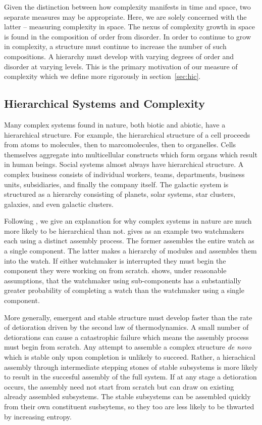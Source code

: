 Given the distinction between how complexity manifests in time and space, two
separate measures may be appropriate. Here, we are solely concerned with the
latter -- measuring complexity in space. The nexus of complexity growth in space
is found in the composition of order from disorder. In order to continue to
grow in complexity, a structure must continue to increase the number of such
compositions. A hierarchy must develop with varying degrees of order and
disorder at varying levels. This is the primary motivation of our measure of
complexity which we define more rigorously in section~\ref{sec:hic}.

\subsection{Hierarchical Systems and Complexity}

Many complex systems found in nature, both biotic and abiotic, have a
hierarchical structure. For example, the hierarchical structure of a cell
proceeds from atoms to molecules, then to marcomolecules, then
to organelles. Cells themselves aggregate into multicellular constructs which form
organs which result in human beings. Social systems almost always have
hierarchical structure. A complex business consists of individual workers,
teams, departments, business units, subsidiaries, and finally the company itself.
The galactic system is structured as a hierarchy consisting of
planets, solar systems, star clusters, galaxies, and even galactic clusters.

Following \citet{simon1991architecture}, we give an explanation for why complex
systems in nature are much more likely to be hierarchical than not.
\citet{simon1991architecture} gives as an example two watchmakers each using a
distinct assembly process. The former assembles the entire watch as a single
component. The latter makes a hierarchy of modules and assembles them into the
watch. If either watchmaker is interrupted they must begin the component they
were working on from scratch. \citet{simon1991architecture} shows, under
reasonable assumptions, that the watchmaker using sub-components has a
substantially greater probability of completing a watch than the watchmaker
using a single component.

More generally, emergent and stable structure must develop faster than the rate
of detioration driven by the second law of thermodynamics. A small number of
detiorations can cause a catastrophic failure which means the assembly process
must begin from scratch. Any attempt to assemble a complex structure \emph{de
novo} which is stable only upon completion is unlikely to succeed. Rather, a
hierachical assembly through intermediate stepping stones of stable subsystems
is more likely to result in the succesful assembly of the full system. If at
any stage a detioration occurs, the assembly need not start from scratch but
can draw on existing already assembled subsystems. The stable subsystems can be
assembled quickly from their own constituent susbsytems, so they too are less
likely to be thwarted by increasing entropy.

